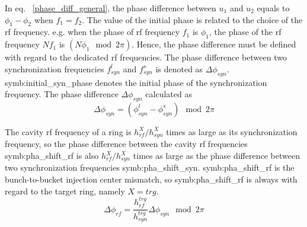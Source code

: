 In eq. ~\ref{phase_diff_general}, the phase difference between $u_1$ and $u_2$ equals to $\phi_1-\phi_2$ when $f_1=f_2$. The value of the initial phase is related to the choice of the rf frequency. e.g. when the phase of rf frequency $f_1$ is $\phi_1$, the phase of the rf frequency $Nf_1$ is $(N\phi_1 \mod 2\pi)$. Hence, the phase difference must be defined with regard to the dedicated rf frequencies. The phase difference between two synchronization frequencies $f_{\mathit{syn}}^{l}$ and $f_{\mathit{syn}}^{s}$ is denoted as $\Delta \phi_\mathit{syn}$. \gls{symb:initial_syn_phase} denotes the initial phase of the synchronization frequency. The phase difference $\Delta \phi_\mathit{syn}$ calculated as
\begin{equation}
\label{phase_diff_cir_int1}
	\Delta \phi_\mathit{syn}=(\phi^l_\mathit{syn}-\phi^s_\mathit{syn}) \mod 2\pi
\end{equation}

The cavity rf frequency of a ring is $h_{\mathit{rf}}^{X}/h_{\mathit{syn}}^{X}$ times as large as its synchronization frequency, so the phase difference between the cavity rf frequencies \gls{symb:pha_shift_rf} is also $h_{\mathit{rf}}^{X}/h_{\mathit{syn}}^{X}$ times as large as the phase difference between two synchronization frequencies \gls{symb:pha_shift_syn}. \gls{symb:pha_shift_rf} is the bunch-to-bucket injection center mismatch, so \gls{symb:pha_shift_rf} is always with regard to the target ring, namely $X=trg$.
\begin{equation}
\Delta \phi_\mathit{rf}=\frac{h_{\mathit{rf}}^{trg}}{h_{\mathit{syn}}^{trg}}\Delta \phi_\mathit{syn} \mod 2\pi \label{phase_diff_rf}
\end{equation}



